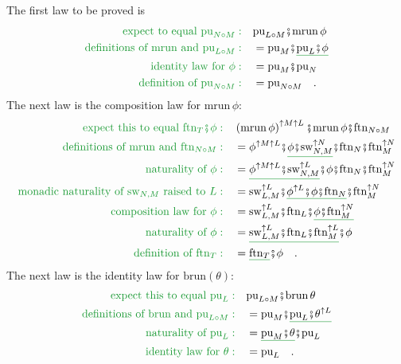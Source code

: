 The first law to be proved is
\begin{align*}
{\color{greenunder}\text{expect to equal }\text{pu}_{N\circ M}:}\quad & \text{pu}_{L\circ M}\bef\text{mrun}\,\phi\\
{\color{greenunder}\text{definitions of }\text{mrun}\text{ and }\text{pu}_{L\circ M}:}\quad & =\text{pu}_{M}\bef\gunderline{\text{pu}_{L}\bef\phi}\\
{\color{greenunder}\text{identity law for }\phi:}\quad & =\text{pu}_{M}\bef\text{pu}_{N}\\
{\color{greenunder}\text{definition of }\text{pu}_{N\circ M}:}\quad & =\text{pu}_{N\circ M}\quad.
\end{align*}
The next law is the composition law for $\text{mrun}\,\phi$:
\begin{align*}
{\color{greenunder}\text{expect this to equal }\text{ftn}_{T}\bef\phi:}\quad & \left(\text{mrun}\,\phi\right)^{\uparrow M\uparrow L}\bef\text{mrun}\,\phi\bef\text{ftn}_{N\circ M}\\
{\color{greenunder}\text{definitions of }\text{mrun}\text{ and }\text{ftn}_{N\circ M}:}\quad & =\phi^{\uparrow M\uparrow L}\bef\gunderline{\phi\bef\text{sw}_{N,M}^{\uparrow N}}\bef\text{ftn}_{N}\bef\text{ftn}_{M}^{\uparrow N}\\
{\color{greenunder}\text{naturality of }\phi:}\quad & =\gunderline{\phi^{\uparrow M\uparrow L}\bef\text{sw}_{N,M}^{\uparrow L}}\bef\phi\bef\text{ftn}_{N}\bef\text{ftn}_{M}^{\uparrow N}\\
{\color{greenunder}\text{monadic naturality of }\text{sw}_{N,M}\text{ raised to }L:}\quad & =\text{sw}_{L,M}^{\uparrow L}\bef\gunderline{\phi^{\uparrow L}\bef\phi\bef\text{ftn}_{N}}\bef\text{ftn}_{M}^{\uparrow N}\\
{\color{greenunder}\text{composition law for }\phi:}\quad & =\text{sw}_{L,M}^{\uparrow L}\bef\text{ftn}_{L}\bef\gunderline{\phi\bef\text{ftn}_{M}^{\uparrow N}}\\
{\color{greenunder}\text{naturality of }\phi:}\quad & =\gunderline{\text{sw}_{L,M}^{\uparrow L}\bef\text{ftn}_{L}\bef\text{ftn}_{M}^{\uparrow L}}\bef\phi\\
{\color{greenunder}\text{definition of }\text{ftn}_{T}:}\quad & =\gunderline{\text{ftn}_{T}}\bef\phi\quad.
\end{align*}
The next law is the identity law for $\text{brun}\left(\theta\right)$:
\begin{align*}
{\color{greenunder}\text{expect this to equal }\text{pu}_{L}:}\quad & \text{pu}_{L\circ M}\bef\text{brun}\,\theta\\
{\color{greenunder}\text{definitions of }\text{brun}\text{ and }\text{pu}_{L\circ M}:}\quad & =\text{pu}_{M}\bef\gunderline{\text{pu}_{L}\bef\theta^{\uparrow L}}\\
{\color{greenunder}\text{naturality of }\text{pu}_{L}:}\quad & =\gunderline{\text{pu}_{M}\bef\theta}\bef\text{pu}_{L}\\
{\color{greenunder}\text{identity law for }\theta:}\quad & =\text{pu}_{L}\quad.
\end{align*}
